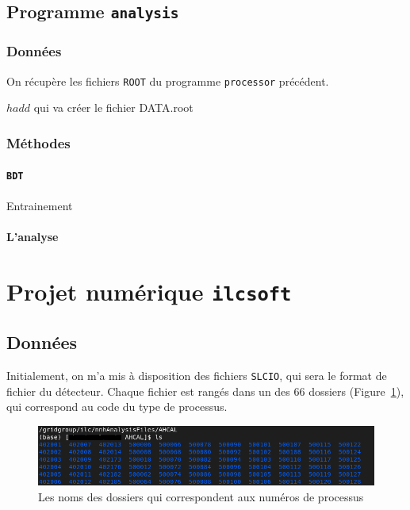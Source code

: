 \documentclass[10pt,a4paper]{report}
\newcommand{\ROOT}{\texttt{ROOT}\xspace}
\newcommand{\SLCIO}{\texttt{SLCIO}\xspace}
\newcommand{\ilcsoft}{\texttt{ilcsoft}\xspace}
\newcommand{\processor}{\texttt{processor}\xspace}
\newcommand{\analysis}{\texttt{analysis}\xspace}
\begin{document}
\subsection{Programme \analysis}

\subsubsection{Données}

On récupère les fichiers \ROOT du programme \processor précédent. 

$ hadd $ qui va créer le fichier DATA.root

\subsubsection{Méthodes}

\paragraph{\texttt{BDT}}

Entrainement

\paragraph{L'analyse}

\section{Projet numérique \ilcsoft}

\subsection{Données}
Initialement, on m'a mis à disposition des fichiers \SLCIO, qui sera le format de fichier du détecteur.
Chaque fichier est rangés dans un des 66 dossiers (Figure~\ref{listeProcessus}), qui correspond au code du type de processus.

\begin{figure}[h!]
	\includegraphics[width=\textwidth]{../img/listeProcessus.png} 
	\caption{Les noms des dossiers qui correspondent aux numéros de processus}
	\label{listeProcessus}
\end{figure}
\end{document}
